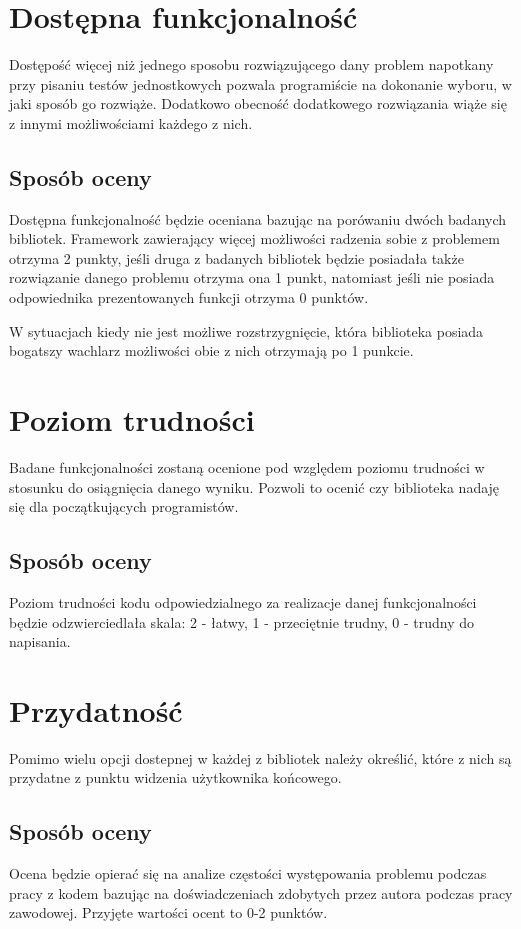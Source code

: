 \documentclass[12pt,a4paper,notitlepage]{report}
\begin{document}
\section{Dostępna funkcjonalność}

Dostępość więcej niż jednego sposobu rozwiązującego dany problem napotkany przy pisaniu testów jednostkowych pozwala programiście na dokonanie wyboru, w jaki sposób go rozwiąże. Dodatkowo obecność dodatkowego rozwiązania wiąże się z innymi możliwościami każdego z nich.

\subsection{Sposób oceny}
Dostępna funkcjonalność będzie oceniana bazując na porówaniu dwóch badanych bibliotek. Framework zawierający więcej możliwości radzenia sobie z problemem otrzyma 2 punkty, jeśli druga z badanych bibliotek będzie posiadała także rozwiązanie danego problemu otrzyma ona 1 punkt, natomiast jeśli nie posiada odpowiednika prezentowanych funkcji otrzyma 0 punktów.

W sytuacjach kiedy nie jest możliwe rozstrzygnięcie, która biblioteka posiada bogatszy wachlarz możliwości obie z nich otrzymają po 1 punkcie.

\section{Poziom trudności}

Badane funkcjonalności zostaną ocenione pod względem poziomu trudności w stosunku do osiągnięcia danego wyniku. Pozwoli to ocenić czy biblioteka nadaję się dla początkujących programistów.

\subsection{Sposób oceny}
Poziom trudności kodu odpowiedzialnego za realizacje danej funkcjonalności będzie odzwierciedlała skala: 2 - łatwy, 1 - przeciętnie trudny, 0 - trudny do napisania.

\section{Przydatność}

Pomimo wielu opcji dostepnej w każdej z bibliotek należy określić, które z nich są przydatne z punktu widzenia użytkownika końcowego.

\subsection{Sposób oceny}
Ocena będzie opierać się na analize częstości występowania problemu podczas pracy z kodem bazując na doświadczeniach zdobytych przez autora podczas pracy zawodowej. Przyjęte wartości ocent to 0-2 punktów.
\end{document}
